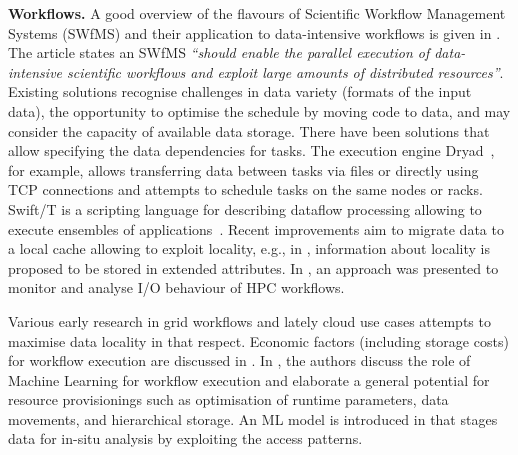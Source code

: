 \documentclass{superfri}
\begin{document}
\smallskip

\textbf{Workflows. }
A good overview of the flavours of Scientific Workflow Management Systems (SWfMS) and their application to data-intensive workflows is given in \cite{liu2015survey}.
The article states an SWfMS \textit{“should enable the parallel execution of data-intensive scientific workflows and exploit large amounts of distributed resources”}.
Existing solutions recognise challenges in data variety (formats of the input data), the opportunity to optimise the schedule by moving code to data, and may consider the capacity of available data storage.
There have been solutions that allow specifying the data dependencies for tasks.
The execution engine Dryad~\cite{isard2007dryad}, for example, allows transferring data between tasks via files or directly using TCP connections and attempts to schedule tasks on the same nodes or racks.
Swift/T is a scripting language for describing dataflow processing allowing to execute ensembles of applications~\cite{ozik2016desktop}.
Recent improvements aim to migrate data to a local cache allowing to exploit locality, e.g., in \cite{dai2018cross}, information about locality is proposed to be stored in extended attributes.
In \cite{TUIBIHWLSC19}, an approach was presented to monitor and analyse I/O behaviour of HPC workflows.

Various early research in grid workflows and lately cloud use cases attempts to maximise data locality in that respect.
Economic factors (including storage costs) for workflow execution are discussed in \cite{alkhanak2016cost}.
In \cite{deelman2019role}, the authors discuss the role of Machine Learning for workflow execution and elaborate a general potential for resource provisionings such as optimisation of runtime parameters, data movements, and hierarchical storage.
An ML model is introduced in \cite{subedi2019leveraging} that stages data for in-situ analysis by exploiting the access patterns.


\end{document}
